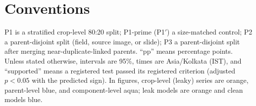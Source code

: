 \section*{Conventions}

P1 is a stratified crop-level 80:20 split; P1-prime (P1$'$) a size-matched control; P2 a parent-disjoint split (field,
source image, or slide); P3 a parent-disjoint split after merging near-duplicate-linked parents. ``pp'' means percentage
points. Unless stated otherwise, intervals are 95\%, times are Asia/Kolkata (IST), and ``supported'' means a registered
test passed its registered criterion (adjusted $p<0.05$ with the predicted sign). In figures, crop-level (leaky) series
are orange, parent-level blue, and component-level aqua; leak models are orange and clean models blue.
